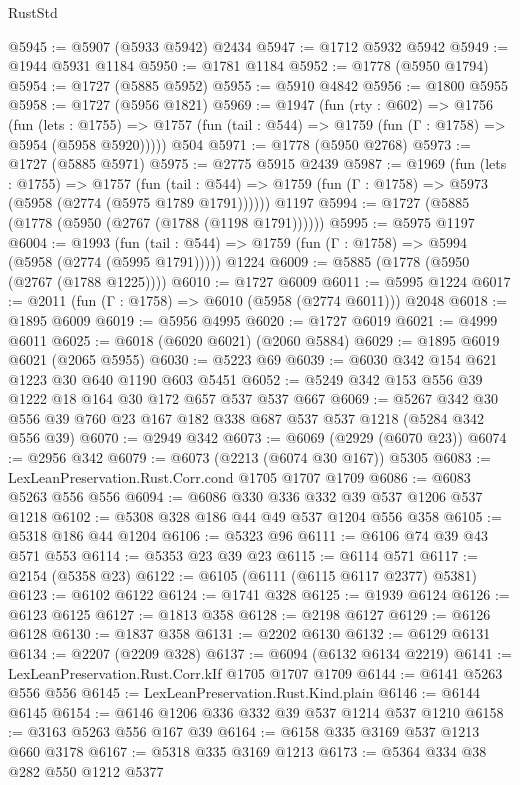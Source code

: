 \begin{lexlean}{RustStd}
\begin{coremodule}
@5945 := @5907 (@5933 @5942) @2434
@5947 := @1712 @5932 @5942
@5949 := @1944 @5931 @1184
@5950 := @1781 @1184
@5952 := @1778 (@5950 @1794)
@5954 := @1727 (@5885 @5952)
@5955 := @5910 @4842
@5956 := @1800 @5955
@5958 := @1727 (@5956 @1821)
@5969 := @1947
    (fun (rty : @602) =>
    @1756
      (fun (lets : @1755) =>
      @1757 (fun (tail : @544) => @1759 (fun (Γ : @1758) => @5954 (@5958 @5920)))))
    @504
@5971 := @1778 (@5950 @2768)
@5973 := @1727 (@5885 @5971)
@5975 := @2775 @5915 @2439
@5987 := @1969
    (fun (lets : @1755) =>
    @1757
      (fun (tail : @544) => @1759 (fun (Γ : @1758) => @5973 (@5958 (@2774 (@5975 @1789 @1791))))))
    @1197
@5994 := @1727 (@5885 (@1778 (@5950 (@2767 (@1788 (@1198 @1791))))))
@5995 := @5975 @1197
@6004 := @1993
    (fun (tail : @544) => @1759 (fun (Γ : @1758) => @5994 (@5958 (@2774 (@5995 @1791)))))
    @1224
@6009 := @5885 (@1778 (@5950 (@2767 (@1788 @1225))))
@6010 := @1727 @6009
@6011 := @5995 @1224
@6017 := @2011 (fun (Γ : @1758) => @6010 (@5958 (@2774 @6011))) @2048
@6018 := @1895 @6009
@6019 := @5956 @4995
@6020 := @1727 @6019
@6021 := @4999 @6011
@6025 := @6018 (@6020 @6021) (@2060 @5884)
@6029 := @1895 @6019 @6021 (@2065 @5955)
@6030 := @5223 @69
@6039 := @6030 @342 @154 @621 @1223 @30 @640 @1190 @603 @5451
@6052 := @5249 @342 @153 @556 @39 @1222 @18 @164 @30 @172 @657 @537 @537 @667
@6069 := @5267 @342 @30 @556 @39 @760 @23 @167 @182 @338 @687 @537 @537 @1218 (@5284 @342 @556 @39)
@6070 := @2949 @342
@6073 := @6069 (@2929 (@6070 @23))
@6074 := @2956 @342
@6079 := @6073 (@2213 (@6074 @30 @167)) @5305
@6083 := LexLeanPreservation.Rust.Corr.cond @1705 @1707 @1709
@6086 := @6083 @5263 @556 @556
@6094 := @6086 @330 @336 @332 @39 @537 @1206 @537 @1218
@6102 := @5308 @328 @186 @44 @49 @537 @1204 @556 @358
@6105 := @5318 @186 @44 @1204
@6106 := @5323 @96
@6111 := @6106 @74 @39 @43 @571 @553
@6114 := @5353 @23 @39 @23
@6115 := @6114 @571
@6117 := @2154 (@5358 @23)
@6122 := @6105 (@6111 (@6115 @6117 @2377) @5381)
@6123 := @6102 @6122
@6124 := @1741 @328
@6125 := @1939 @6124
@6126 := @6123 @6125
@6127 := @1813 @358
@6128 := @2198 @6127
@6129 := @6126 @6128
@6130 := @1837 @358
@6131 := @2202 @6130
@6132 := @6129 @6131
@6134 := @2207 (@2209 @328)
@6137 := @6094 (@6132 @6134 @2219)
@6141 := LexLeanPreservation.Rust.Corr.kIf @1705 @1707 @1709
@6144 := @6141 @5263 @556 @556
@6145 := LexLeanPreservation.Rust.Kind.plain
@6146 := @6144 @6145
@6154 := @6146 @1206 @336 @332 @39 @537 @1214 @537 @1210
@6158 := @3163 @5263 @556 @167 @39
@6164 := @6158 @335 @3169 @537 @1213 @660 @3178
@6167 := @5318 @335 @3169 @1213
@6173 := @5364 @334 @38 @282 @550 @1212 @5377

\end{coremodule}
\end{lexlean}

